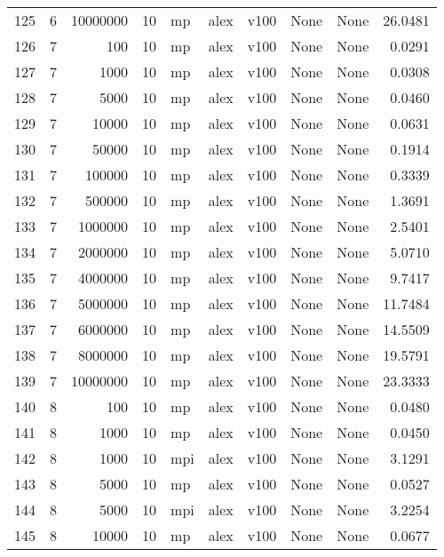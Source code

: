 \begin{tabular}{lrrrlllllr}
125 &   6 &  10000000 &      10 &   mp &  alex &  v100 &  None &  None &  26.0481 \\
126 &   7 &       100 &      10 &   mp &  alex &  v100 &  None &  None &   0.0291 \\
127 &   7 &      1000 &      10 &   mp &  alex &  v100 &  None &  None &   0.0308 \\
128 &   7 &      5000 &      10 &   mp &  alex &  v100 &  None &  None &   0.0460 \\
129 &   7 &     10000 &      10 &   mp &  alex &  v100 &  None &  None &   0.0631 \\
130 &   7 &     50000 &      10 &   mp &  alex &  v100 &  None &  None &   0.1914 \\
131 &   7 &    100000 &      10 &   mp &  alex &  v100 &  None &  None &   0.3339 \\
132 &   7 &    500000 &      10 &   mp &  alex &  v100 &  None &  None &   1.3691 \\
133 &   7 &   1000000 &      10 &   mp &  alex &  v100 &  None &  None &   2.5401 \\
134 &   7 &   2000000 &      10 &   mp &  alex &  v100 &  None &  None &   5.0710 \\
135 &   7 &   4000000 &      10 &   mp &  alex &  v100 &  None &  None &   9.7417 \\
136 &   7 &   5000000 &      10 &   mp &  alex &  v100 &  None &  None &  11.7484 \\
137 &   7 &   6000000 &      10 &   mp &  alex &  v100 &  None &  None &  14.5509 \\
138 &   7 &   8000000 &      10 &   mp &  alex &  v100 &  None &  None &  19.5791 \\
139 &   7 &  10000000 &      10 &   mp &  alex &  v100 &  None &  None &  23.3333 \\
140 &   8 &       100 &      10 &   mp &  alex &  v100 &  None &  None &   0.0480 \\
141 &   8 &      1000 &      10 &   mp &  alex &  v100 &  None &  None &   0.0450 \\
142 &   8 &      1000 &      10 &  mpi &  alex &  v100 &  None &  None &   3.1291 \\
143 &   8 &      5000 &      10 &   mp &  alex &  v100 &  None &  None &   0.0527 \\
144 &   8 &      5000 &      10 &  mpi &  alex &  v100 &  None &  None &   3.2254 \\
145 &   8 &     10000 &      10 &   mp &  alex &  v100 &  None &  None &   0.0677 \\

\end{tabular}
